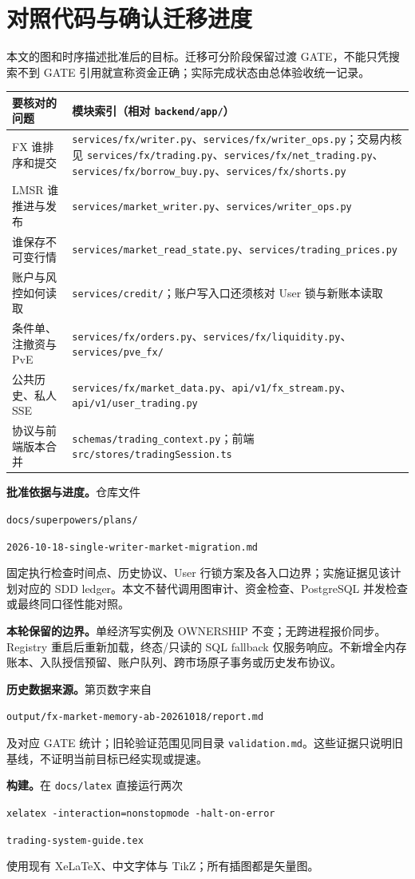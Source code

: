 \documentclass[11pt,a4paper,twoside]{article}
\newcommand{\newtopic}[1]{\clearpage\section{#1}}
\begin{document}
\newtopic{对照代码与确认迁移进度}\label{sec:references}
本文的图和时序描述批准后的目标。迁移可分阶段保留过渡 GATE，不能只凭搜索不到 GATE 引用就宣称资金正确；实际完成状态由总体验收统一记录。

\begin{tabularx}{\linewidth}{@{}>{\raggedright\arraybackslash}p{30mm}>{\raggedright\arraybackslash}X@{}}
\toprule
要核对的问题 & 模块索引（相对 \texttt{backend/app/}）\\\midrule
FX 谁排序和提交 & \texttt{services/fx/writer.py}、\texttt{services/fx/writer\_ops.py}；交易内核见 \texttt{services/fx/trading.py}、\texttt{services/fx/net\_trading.py}、\texttt{services/fx/borrow\_buy.py}、\texttt{services/fx/shorts.py}\\
LMSR 谁推进与发布 & \texttt{services/market\_writer.py}、\texttt{services/writer\_ops.py}\\
谁保存不可变行情 & \texttt{services/market\_read\_state.py}、\texttt{services/trading\_prices.py}\\
账户与风控如何读取 & \texttt{services/credit/}；账户写入口还须核对 User 锁与新账本读取\\
条件单、注撤资与 PvE & \texttt{services/fx/orders.py}、\texttt{services/fx/liquidity.py}、\texttt{services/pve\_fx/}\\
公共历史、私人 SSE & \texttt{services/fx/market\_data.py}、\texttt{api/v1/fx\_stream.py}、\texttt{api/v1/user\_trading.py}\\
协议与前端版本合并 & \texttt{schemas/trading\_context.py}；前端 \texttt{src/stores/tradingSession.ts}\\
\bottomrule
\end{tabularx}

\textbf{批准依据与进度。}仓库文件\par
{\raggedright\small\texttt{docs/superpowers/plans/}\par
\texttt{2026-10-18-single-writer-market-migration.md}\par}
固定执行检查时间点、历史协议、User 行锁方案及各入口边界；实施证据见该计划对应的 SDD ledger。本文不替代调用图审计、资金检查、PostgreSQL 并发检查或最终同口径性能对照。

\textbf{本轮保留的边界。}单经济写实例及 OWNERSHIP 不变；无跨进程报价同步。Registry 重启后重新加载，终态/只读的 SQL fallback 仅服务响应。不新增全内存账本、入队授信预留、账户队列、跨市场原子事务或历史发布协议。

\textbf{历史数据来源。}第\pageref{sec:queue}页数字来自\par
{\raggedright\small\texttt{output/fx-market-memory-ab-20261018/report.md}\par}
及对应 GATE 统计；旧轮验证范围见同目录 \texttt{validation.md}。这些证据只说明旧基线，不证明当前目标已经实现或提速。

\textbf{构建。}在 \texttt{docs/latex} 直接运行两次\par
{\raggedright\small\texttt{xelatex -interaction=nonstopmode -halt-on-error}\par
\texttt{trading-system-guide.tex}\par}
使用现有 XeLaTeX、中文字体与 TikZ；所有插图都是矢量图。
\label{guide:lastpage}
\end{document}
